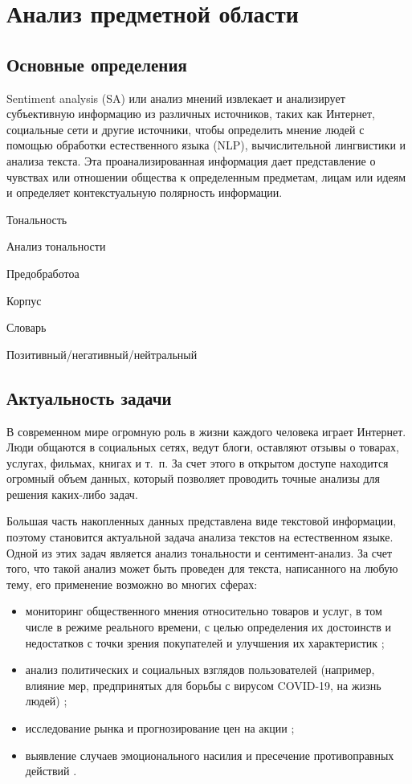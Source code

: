\chapter{Анализ предметной области}

\section{Основные определения}

Sentiment analysis (SA) или анализ мнений извлекает и анализирует субъективную
информацию из различных источников, таких как Интернет, социальные сети и другие
источники, чтобы определить мнение людей с помощью обработки естественного языка
(NLP), вычислительной лингвистики и анализа текста.  Эта проанализированная
информация дает представление о чувствах или отношении общества к определенным
предметам, лицам или идеям и определяет контекстуальную полярность информации.
\cite{article2}


Тональность

Анализ тональности

Предобработоа

Корпус

Словарь

Позитивный/негативный/нейтральный

\section{Актуальность задачи}

В современном мире огромную роль в жизни каждого человека играет Интернет.
Люди общаются в социальных сетях, ведут блоги, оставляют отзывы о товарах,
услугах, фильмах, книгах и т.~п. За счет этого в открытом доступе находится
огромный объем данных, который позволяет проводить точные анализы для
решения каких-либо задач.  

Большая часть накопленных данных представлена виде текстовой информации, поэтому
становится актуальной задача анализа текстов на естественном языке.
\cite{article8} Одной из
этих задач является анализ тональности и сентимент-анализ. 
За счет того, что такой анализ может быть проведен для текста, написанного
на любую тему, его применение возможно во многих сферах:
\begin{itemize}
    \item мониторинг общественного мнения \cite{article1} относительно товаров и
        услуг, в том числе в режиме реального времени, с целью определения их
        достоинств и недостатков с точки зрения покупателей и улучшения их
        характеристик \cite{article3};
    \item анализ политических и социальных взглядов пользователей (например,
        влияние мер, предпринятых для борьбы с вирусом COVID-19, на жизнь
        людей) \cite{article3};
    \item исследование рынка и прогнозирование цен на акции
        \cite{article3};
    \item выявление случаев эмоционального насилия и пресечение
        противоправных действий \cite{article6}.
\end{itemize}

